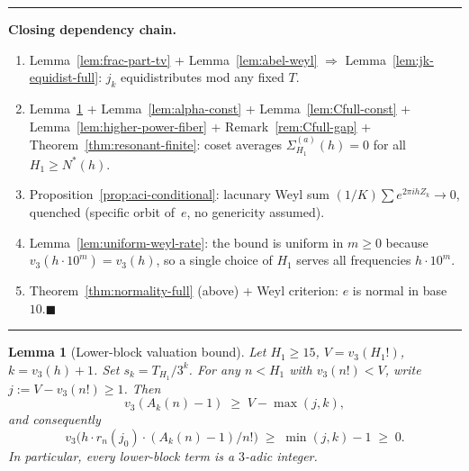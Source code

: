 \documentclass[
]{article}
\newtheorem{lemma}[theorem]{Lemma}
\begin{document}
\begin{center}\rule{0.5\linewidth}{0.4pt}\end{center}
\noindent\textbf{Closing dependency chain.}
\begin{enumerate}
\item Lemma~\ref{lem:frac-part-tv} + Lemma~\ref{lem:abel-weyl}
  $\Rightarrow$ Lemma~\ref{lem:jk-equidist-full}:
  $j_k$ equidistributes mod any fixed $T$.
\item Lemma~\ref{lem:lower-block-val} + Lemma~\ref{lem:alpha-const}
  + Lemma~\ref{lem:Cfull-const} + Lemma~\ref{lem:higher-power-fiber}
  + Remark~\ref{rem:Cfull-gap} + Theorem~\ref{thm:resonant-finite}:
  coset averages $\Sigma_{H_1}^{(a)}(h)=0$ for all $H_1\ge N^*(h)$.
\item Proposition~\ref{prop:aci-conditional}:
  lacunary Weyl sum $(1/K)\sum e^{2\pi ihZ_k}\to 0$,
  quenched (specific orbit of~$e$, no genericity assumed).
\item Lemma~\ref{lem:uniform-weyl-rate}:
  the bound is uniform in $m\ge 0$ because $v_3(h\cdot 10^m)=v_3(h)$,
  so a single choice of $H_1$ serves all frequencies $h\cdot 10^m$.
\item Theorem~\ref{thm:normality-full} (above) + Weyl criterion:
  $e$ is normal in base~$10$.\quad $\blacksquare$
\end{enumerate}
\begin{center}\rule{0.5\linewidth}{0.4pt}\end{center}


\begin{lemma}[Lower-block valuation bound]\label{lem:lower-block-val}
Let $H_1\ge 15$, $V=v_3(H_1!)$, $k=v_3(h)+1$.
Set $s_k=T_{H_1}/3^k$.  For any $n<H_1$ with $v_3(n!)<V$,
write $j:=V-v_3(n!)\ge 1$.  Then
\[
  v_3(A_k(n)-1)\;\ge\;V-\max(j,k),
\]
and consequently
\[
  v_3\!\bigl(h\cdot r_n(j_0)\cdot(A_k(n)-1)/n!\bigr)
  \;\ge\;\min(j,k)-1\;\ge\;0.
\]
In particular, every lower-block term is a $3$-adic integer.
\end{lemma}
\end{document}
